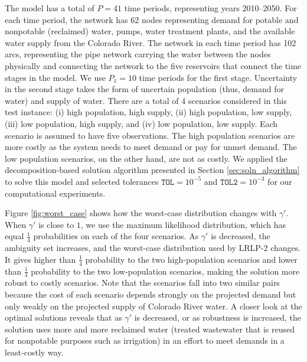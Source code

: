 \documentclass[11pt]{article}
\begin{document}
The model has a total of $P = 41$ time periods, representing years 2010--2050. 
For each time period, the network has 62 nodes representing demand for potable and nonpotable (reclaimed) water, pumps, water treatment plants, and the available water supply from the Colorado River.
The network in each time period has 102 arcs, representing the pipe network carrying the water between the nodes physically and connecting the network to the five reservoirs that connect the time stages in the model.
We use $P_1 = 10$ time periods for the first stage.
Uncertainty in the second stage takes the form of uncertain population (thus, demand for water) and supply of water.
There are a total of 4 scenarios considered in this test instance: (i) high population, high supply, (ii) high population, low supply, (iii) low population, high supply, and (iv) low population, low supply.
Each scenario is assumed to have five observations.
The high population scenarios are more costly as the system needs to meet demand or pay for unmet demand.
The low population scenarios, on the other hand, are not as costly. 
We applied the decomposition-based solution algorithm presented in Section \ref{sec:soln_algorithm} to solve this model and selected tolerances $\texttt{TOL} = 10^{-5}$ and $\texttt{TOL2} = 10^{-3}$ for our computational experiments.

Figure \ref{fig:worst_case} shows how the worst-case distribution changes with $\gamma'$.
When $\gamma'$ is close to $1$, we use the maximum likelihood distribution, which has equal $\tfrac{1}{4}$ probabilities on each of the four scenarios.
As $\gamma'$ is decreased, the ambiguity set increases, and the worst-case distribution used by LRLP-2 changes.
It gives higher than $\tfrac{1}{4}$ probability to the two high-population scenarios and lower than $\tfrac{1}{4}$ probability to the two low-population scenarios, making the solution more robust to costly scenarios.
Note that the scenarios fall into two similar pairs because the cost of each scenario depends strongly on the projected demand but only weakly on the projected supply of Colorado River water.
A closer look at the optimal solutions reveals that as $\gamma'$ is decreased, or as robustness is increased, the solution uses more and more reclaimed water (treated wastewater that is reused for nonpotable purposes such as irrigation) in an effort to meet demands in a least-costly way.
\end{document}
